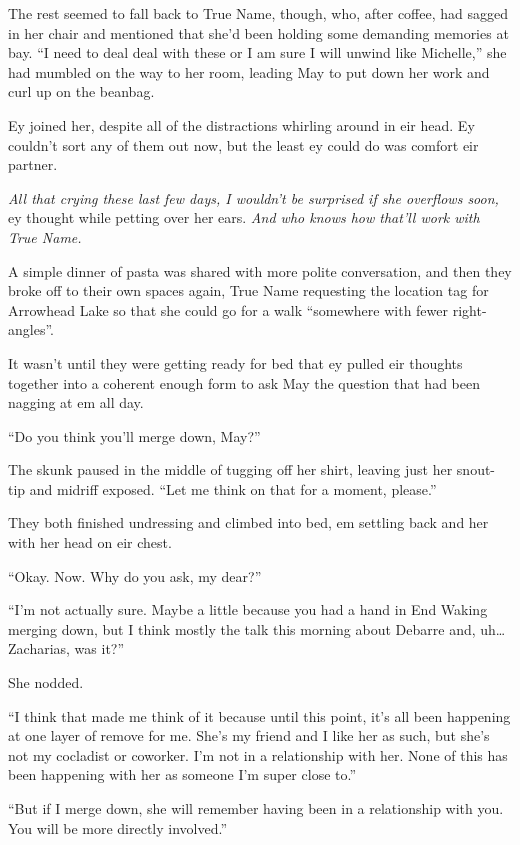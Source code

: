 The rest seemed to fall back to True Name, though, who, after coffee, had sagged in her chair and mentioned that she'd been holding some demanding memories at bay. ``I need to deal deal with these or I am sure I will unwind like Michelle,'' she had mumbled on the way to her room, leading May to put down her work and curl up on the beanbag.

Ey joined her, despite all of the distractions whirling around in eir head. Ey couldn't sort any of them out now, but the least ey could do was comfort eir partner.

\emph{All that crying these last few days, I wouldn't be surprised if she overflows soon,} ey thought while petting over her ears. \emph{And who knows how that'll work with True Name.}

A simple dinner of pasta was shared with more polite conversation, and then they broke off to their own spaces again, True Name requesting the location tag for Arrowhead Lake so that she could go for a walk ``somewhere with fewer right-angles''.

It wasn't until they were getting ready for bed that ey pulled eir thoughts together into a coherent enough form to ask May the question that had been nagging at em all day.

``Do you think you'll merge down, May?''

The skunk paused in the middle of tugging off her shirt, leaving just her snout-tip and midriff exposed. ``Let me think on that for a moment, please.''

They both finished undressing and climbed into bed, em settling back and her with her head on eir chest.

``Okay. Now. Why do you ask, my dear?''

``I'm not actually sure. Maybe a little because you had a hand in End Waking merging down, but I think mostly the talk this morning about Debarre and, uh\ldots Zacharias, was it?''

She nodded.

``I think that made me think of it because until this point, it's all been happening at one layer of remove for me. She's my friend and I like her as such, but she's not my cocladist or coworker. I'm not in a relationship with her. None of this has been happening with her as someone I'm super close to.''

``But if I merge down, she will remember having been in a relationship with you. You will be more directly involved.''

